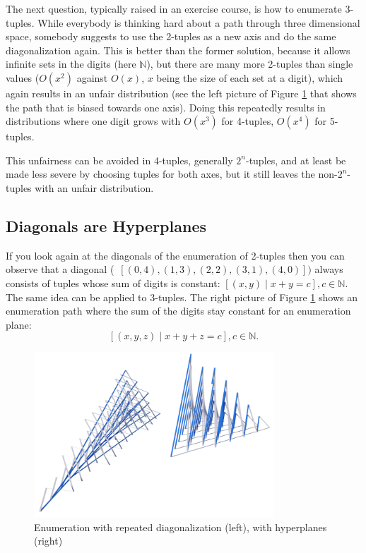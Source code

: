 \documentclass{tmr}
\newcommand{\authornote}[3]{{\color{#2} {\sc #1}: #3}}
\newcommand\bay[1]{\authornote{edward}{blue}{#1}}
\begin{document}
The next question, typically raised in an exercise course, is how to enumerate 3-tuples.
While everybody is thinking hard about a path through three dimensional space, somebody suggests to use the 2-tuples as a new axis and do the same diagonalization again. This is better than the former solution, %
because it allows infinite sets in the digits (here $\mathbb{N}$), but there are many more 2-tuples  than single values ($O(x^2)$ against $O(x)$, $x$ being the size of each set at a digit), which again results in an unfair distribution (see the left picture of Figure \ref{enum3} that shows the path that is biased towards one axis). Doing this repeatedly results in distributions where one digit grows with $O(x^3)$ for 4-tuples, $O(x^4)$ for 5-tuples.

This unfairness can be avoided in 4-tuples, generally $2^n$-tuples, and at least be made less severe by choosing tuples for both axes, %
but it still leaves the non-$2^n$-tuples with an unfair distribution.  %

\subsection{Diagonals are Hyperplanes}
If you look again at the diagonals of the enumeration of 2-tuples then you can observe that a diagonal (\eg\ $ [ (0,4), (1,3), (2,2), (3,1), (4,0) ])$ always consists of tuples whose sum of digits is constant:
$  [ (x,y)  \mid  x+y  = c ], c \in \mathbb{N}. $
The same idea can be applied to 3-tuples. The right picture of Figure \ref{enum3} shows an enumeration path where the sum of the digits stay constant for an enumeration plane:
\[  [ (x,y,z)  \mid  x+y+z  = c ], c \in \mathbb{N}. \]

\begin{figure}[htbp]
  \centering
    \includegraphics[width=0.8\textwidth]{enumerate2.png}
    \caption{Enumeration with repeated diagonalization (left), with hyperplanes (right) }%
  \label{enum3}
\end{figure}
\end{document}
